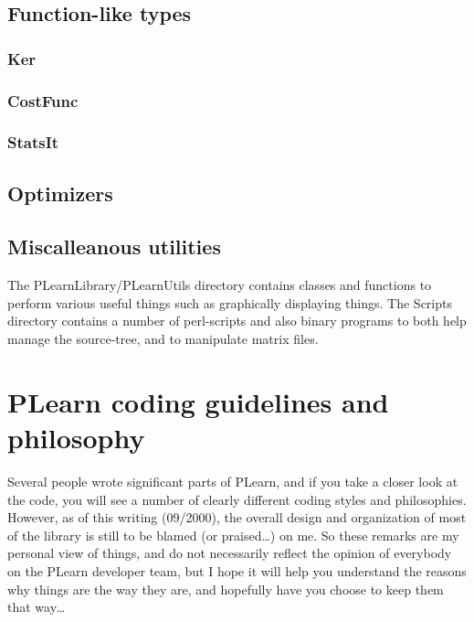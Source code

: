 \documentclass[11pt]{book}
\begin{document}
\section{Function-like types}
\subsection{Ker}
\subsection{CostFunc}
\subsection{StatsIt}
\section{Optimizers}
\label{Optimizer}

%
%
\section{ Miscalleanous utilities}

 The PLearnLibrary/PLearnUtils directory contains classes and
functions to perform various useful things such as graphically
displaying things. The Scripts directory contains a number of
perl-scripts and also binary programs to both help manage the
source-tree, and to manipulate matrix files.


\chapter{ PLearn coding guidelines and philosophy}

 Several people wrote significant parts of PLearn, and if you take a
closer look at the code, you will see a number of clearly different
coding styles and philosophies. However, as of this writing (09/2000),
the overall design and organization of most of the library is still to
be blamed (or praised\ldots) on me. So these remarks are my personal
view of things, and do not necessarily reflect the opinion of everybody
on the PLearn developer team, but I hope it will help you understand
the reasons why things are the way they are, and hopefully have you
choose to keep them that way\ldots
\end{document}
